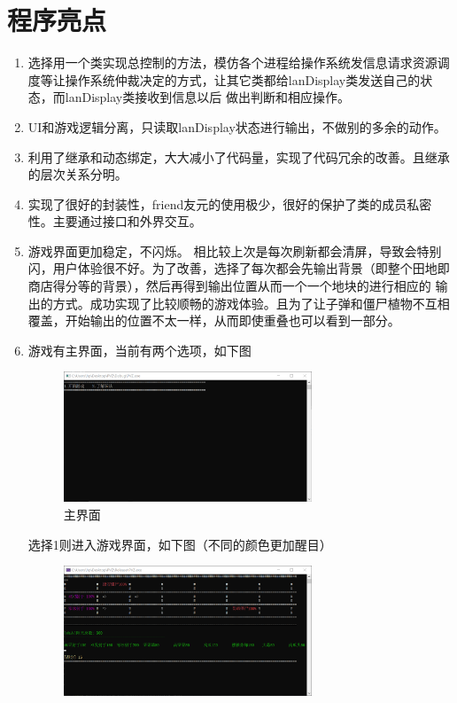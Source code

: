 \documentclass[12pt,a4paper,UTF8]{article}
\begin{document}
\section{程序亮点}
\begin{enumerate}
  \item 选择用一个类实现总控制的方法，模仿各个进程给操作系统发信息请求资源调度等让操作系统仲裁决定的方式，让其它类都给lanDisplay类发送自己的状态，而lanDisplay类接收到信息以后
  做出判断和相应操作。
  \item UI和游戏逻辑分离，只读取lanDisplay状态进行输出，不做别的多余的动作。
  \item 利用了继承和动态绑定，大大减小了代码量，实现了代码冗余的改善。且继承的层次关系分明。
  \item 实现了很好的封装性，friend友元的使用极少，很好的保护了类的成员私密性。主要通过接口和外界交互。
  \item 游戏界面更加稳定，不闪烁。
  相比较上次是每次刷新都会清屏，导致会特别闪，用户体验很不好。为了改善，选择了每次都会先输出背景（即整个田地即商店得分等的背景），然后再得到输出位置从而一个一个地块的进行相应的
  输出的方式。成功实现了比较顺畅的游戏体验。且为了让子弹和僵尸植物不互相覆盖，开始输出的位置不太一样，从而即使重叠也可以看到一部分。
  \item 游戏有主界面，当前有两个选项，如下图
  \begin{figure}[H]
    \centering
  \includegraphics[width=0.7\textwidth]{figure/main.png}
  \caption{主界面}
  \end{figure}
  选择1则进入游戏界面，如下图（不同的颜色更加醒目）
  \begin{figure}[H]
    \centering
  \includegraphics[width=0.7\textwidth]{figure/game.png}

\end{figure}
\end{enumerate}
\end{document}
